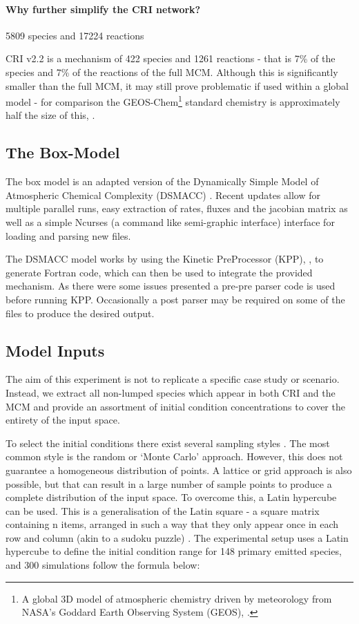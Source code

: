 \paragraph*{Why further simplify the CRI network?}\label{sec:whycri}
5809 species and 17224 reactions

CRI v2.2 \citep{cri} is a mechanism of 422 species and 1261 reactions - that is 7\% of the species and 7\% of the reactions of the full MCM. Although this is significantly smaller than the full MCM, it may still prove problematic if used within a global model - for comparison the GEOS-Chem\footnote{A global 3D model of atmospheric chemistry driven by meteorology from NASA's Goddard Earth Observing System (GEOS), \citep{geos}.} standard chemistry is approximately half the size of this, \citep{geosgit}.

\subsection{The Box-Model}
The box model is an adapted version of the Dynamically Simple Model of Atmospheric Chemical Complexity (DSMACC) \citep{dsmacc,dsmaccgit}. Recent updates allow for multiple parallel runs, easy extraction of rates, fluxes and the jacobian matrix as well as a simple Ncurses (a command like semi-graphic interface) interface for loading and parsing new files.

The DSMACC model works by using the Kinetic PreProcessor (KPP), \citep{kpp}, to generate Fortran code, which can then be used to integrate the provided mechanism. As there were some issues presented a pre-pre parser code is used before running KPP. Occasionally a post parser may be required on some of the files to produce the desired output.

\subsection{Model Inputs}\label{sec:lumpinputs}
The aim of this experiment is not to replicate a specific case study or scenario. Instead, we extract all non-lumped species which appear in both CRI and the MCM and provide an assortment of initial condition concentrations to cover the entirety of the input space.

To select the initial conditions there exist several sampling styles \citep{sampling}. The most common style is the random or `Monte Carlo' approach. However, this does not guarantee a homogeneous distribution of points. A lattice or grid approach is also possible, but that can result in a large number of sample points to produce a complete distribution of the input space. To overcome this, a Latin hypercube can be used. This is a generalisation of the Latin square  -  a square matrix containing n items, arranged in such a way that they only appear once in each row and column (akin to a sudoku puzzle) \citep{lsq}. The experimental setup uses a Latin hypercube to define the initial condition range for 148 primary emitted species, and 300 simulations follow the formula below:

